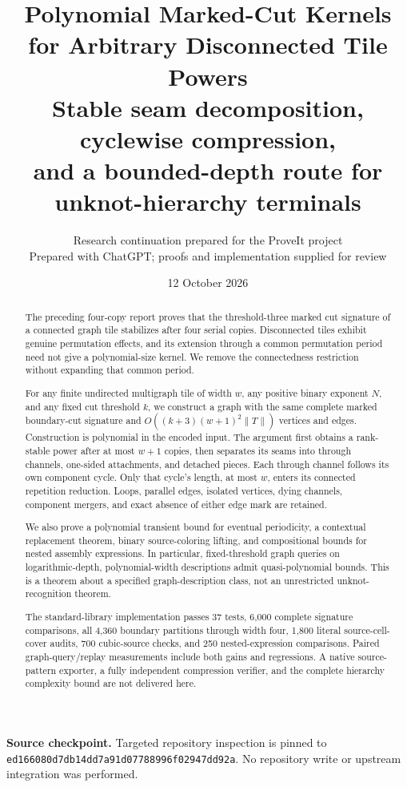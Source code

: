 \documentclass[11pt]{article}
\title{\textbf{Polynomial Marked-Cut Kernels\\for Arbitrary Disconnected Tile Powers}\\[6pt]
\large Stable seam decomposition, cyclewise compression,\\and a bounded-depth route for unknot-hierarchy terminals}
\author{Research continuation prepared for the ProveIt project\\\small Prepared with ChatGPT; proofs and implementation supplied for review}
\date{12 October 2026}
\theoremstyle{remark}\newtheorem{remark}[theorem]{Remark}
\newcommand{\size}[1]{\lVert #1\rVert}
\DeclareRobustCommand{\code}[1]{\nolinkurl{#1}}
\begin{document}
\maketitle
\begin{abstract}
The preceding four-copy report proves that the threshold-three marked cut signature of a connected graph tile stabilizes after four serial copies. Disconnected tiles exhibit genuine permutation effects, and its extension through a common permutation period need not give a polynomial-size kernel. We remove the connectedness restriction without expanding that common period.

For any finite undirected multigraph tile of width $w$, any positive binary exponent $N$, and any fixed cut threshold $k$, we construct a graph with the same complete marked boundary-cut signature and $O((k+3)(w+1)^2\size{T})$ vertices and edges. Construction is polynomial in the encoded input. The argument first obtains a rank-stable power after at most $w+1$ copies, then separates its seams into through channels, one-sided attachments, and detached pieces. Each through channel follows its own component cycle. Only that cycle's length, at most $w$, enters its connected repetition reduction. Loops, parallel edges, isolated vertices, dying channels, component mergers, and exact absence of either edge mark are retained.

We also prove a polynomial transient bound for eventual periodicity, a contextual replacement theorem, binary source-coloring lifting, and compositional bounds for nested assembly expressions. In particular, fixed-threshold graph queries on logarithmic-depth, polynomial-width descriptions admit quasi-polynomial bounds. This is a theorem about a specified graph-description class, not an unrestricted unknot-recognition theorem.

The standard-library implementation passes 37 tests, 6,000 complete signature comparisons, all 4,360 boundary partitions through width four, 1,800 literal source-cell-cover audits, 700 cubic-source checks, and 250 nested-expression comparisons. Paired graph-query/replay measurements include both gains and regressions. A native source-pattern exporter, a fully independent compression verifier, and the complete hierarchy complexity bound are not delivered here.
\end{abstract}
\vfill
\noindent\textbf{Source checkpoint.} Targeted repository inspection is pinned to
\code{ed166080d7db14dd7a91d07788996f02947dd92a}. No repository write or upstream integration was performed.
\clearpage
\setcounter{tocdepth}{1}
\tableofcontents
\clearpage
\end{document}
